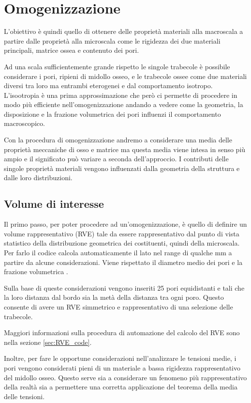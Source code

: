\documentclass[a4paper,num-refs]{oup-contemporary}
\begin{document}
\section{Omogenizzazione}

L'obiettivo è quindi quello di ottenere delle proprietà materiali alla macroscala a partire dalle proprietà alla microscala come le rigidezza dei due  materiali principali, matrice ossea e contenuto dei pori. 

Ad una scala sufficientemente grande rispetto le singole trabecole è possibile considerare i pori, ripieni di midollo osseo, e le trabecole ossee come due materiali diversi tra loro ma entrambi eterogenei e dal comportamento isotropo. L'isootropia è una prima approssimazione che però ci permette di procedere in modo più efficiente nell'omogenizzazione andando a vedere come la geometria, la disposizione e la frazione volumetrica dei pori influenzi il comportamento macroscopico. 

Con la procedura di omogenizzazione andremo a considerare una media delle proprietà meccaniche di osso e matrice ma questa media viene intesa in senso più ampio e il significato può variare a seconda dell'approccio. I contributi delle singole proprietà materiali vengono influenzati dalla geometria della struttura e dalle loro distribuzioni. 

\subsection{Volume di interesse}
\label{sec:RVE}

Il primo passo, per poter procedere ad un'omogenizzazione, è quello di definire un volume rappresentativo (RVE) tale da essere rappresentativo dal punto di vista statistico della distribuzione geometrica dei costituenti, quindi della microscala. Per farlo il codice calcola automaticamente il lato nel range di qualche mm a partire da alcune considerazioni. Viene rispettato il diametro medio dei pori \citep{Doktor:2011} e la frazione volumetrica  \citep{Cowin1}. 

Sulla base di queste considerazioni vengono inseriti 25 pori equidistanti e tali che la loro distanza dal bordo sia la metà della distanza tra ogni poro. Questo consente di avere un RVE simmetrico e rappresentativo di una selezione delle trabecole. 

Maggiori informazioni sulla procedura di automazione del calcolo del RVE sono nella sezione \ref{sec:RVE_code}.

Inoltre, per fare le opportune considerazioni nell'analizzare le tensioni medie, i pori vengono considerati pieni di un materiale a bassa rigidezza rappresentativo del midollo osseo. Questo serve sia a considerare un fenomeno più rappresentativo della realtà sia a permettere una corretta applicazione del teorema della media delle tensioni. 
\end{document}

